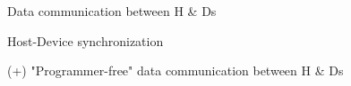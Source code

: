 \documentclass[dvipdfmx,11pt]{beamer}   %
\begin{document}
\begin{frame}{Data communication between H & Ds}

\end{frame}
\begin{frame}{Host-Device synchronization}

\end{frame}
\begin{frame}{(+) "Programmer-free" data communication between H & Ds}

\end{frame}
\end{document}
